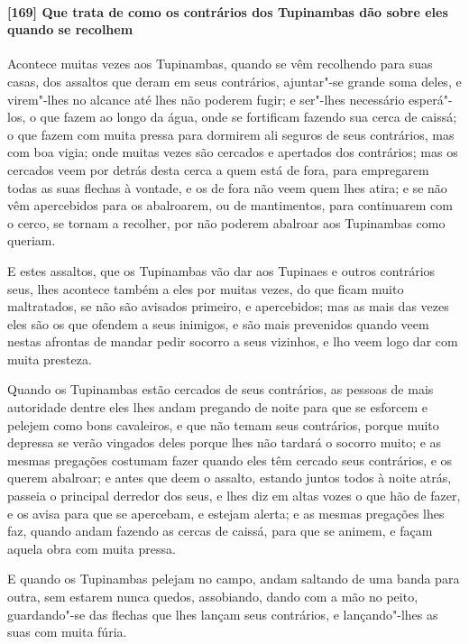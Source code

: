 \paragraph{[169] Que trata de como os contrários dos Tupinambas dão sobre eles quando se
recolhem}\quad
Acontece muitas vezes aos Tupinambas, quando se vêm recolhendo para suas casas, dos
assaltos que deram em seus contrários, ajuntar"-se grande soma deles, e virem"-lhes no
alcance até lhes não poderem fugir; e ser"-lhes necessário esperá"-los, o que fazem ao longo
da água, onde se fortificam fazendo sua cerca de caissá; o que fazem com muita pressa para
dormirem ali seguros de seus contrários, mas com boa vigia; onde muitas vezes são cercados
e apertados dos contrários; mas os cercados veem por detrás desta cerca a quem está de
fora, para empregarem todas as suas flechas à vontade, e os de fora não veem quem lhes
atira; e se não vêm apercebidos para os abalroarem, ou de mantimentos, para continuarem
com o cerco, se tornam a recolher, por não poderem abalroar aos Tupinambas como queriam.

E estes assaltos, que os Tupinambas vão dar aos Tupinaes e outros contrários seus, lhes
acontece também a eles por muitas vezes, do que ficam muito maltratados, se não são
avisados primeiro, e apercebidos; mas as mais das vezes eles são os que ofendem a seus
inimigos, e são mais prevenidos quando veem nestas afrontas de mandar pedir socorro a seus
vizinhos, e lho veem logo dar com muita presteza.

Quando os Tupinambas estão cercados de seus contrários, as pessoas de mais autoridade
dentre eles lhes andam pregando de noite para que se esforcem e pelejem como bons
cavaleiros, e que não temam seus contrários, porque muito depressa se verão vingados deles
porque lhes não tardará o socorro muito; e as mesmas pregações costumam fazer quando eles
têm cercado seus contrários, e os querem abalroar; e antes que deem o assalto, estando
juntos todos à noite atrás, passeia o principal derredor dos seus, e lhes diz em altas
vozes o que hão de fazer, e os avisa para que se apercebam, e estejam alerta; e as mesmas
pregações lhes faz, quando andam fazendo as cercas de caissá, para que se animem, e façam
aquela obra com muita pressa.

E quando os Tupinambas pelejam no campo, andam saltando de uma banda para outra, sem
estarem nunca quedos, assobiando, dando com a mão no peito, guardando"-se das flechas que
lhes lançam seus contrários, e lançando"-lhes as suas com muita fúria.

